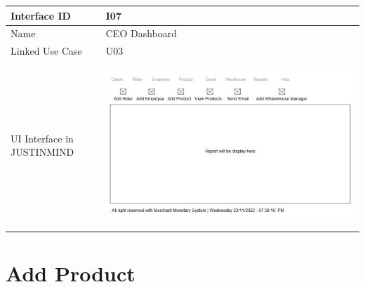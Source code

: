 \documentclass[12pt,a4paper]{report}
\begin{document}
\begin{tabular}{ | m{3cm} | m{12cm}| } \hline

Interface ID &  I07 \\\hline

Name  	      & CEO Dashboard  \\ \hline

Linked Use Case & U03 \\ \hline

UI Interface in JUSTINMIND & \begin{center} \includegraphics[scale=0.3]{./UIs for Latex Reports/UI-007 CEO Dashboard@1x.png}\end{center}  \\ \hline

\end{tabular} 
\section{Add Product }
\end{document}
